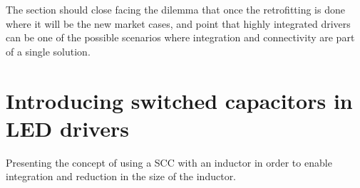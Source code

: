 The section should close facing the dilemma that once the retrofitting is done where it will be the new market cases, and point that highly integrated drivers
can be one of the possible scenarios where integration and connectivity are part of a single solution.


\chapter{Introducing switched capacitors in LED drivers}
Presenting the concept of using a SCC with an inductor in order to enable integration and reduction in the size of the inductor.



